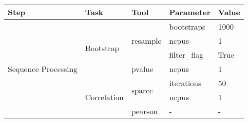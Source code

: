 \begin{table}[H]
\centering
\small
\begin{tabular}{lllll}
\hline
\textbf{Step}                             & \textbf{Task}                                            & \textbf{Tool}                          & \textbf{Parameter}                     & \textbf{Value}                                                                                           \\ \hline
\multirow{17}{*}{Sequence Processing}     & \multirow{4}{*}{Bootstrap}                               & \multirow{3}{*}{resample}              & bootstraps                             & 1000                                                                                                     \\
                                          &                                                          &                                        & ncpus                                  & 1                                                                                                        \\
                                          &                                                          &                                        & filter\_flag                           & True                                                                                                     \\
                                          &                                                          & pvalue                                 & ncpus                                  & 1                                                                                                        \\ \cline{2-5}
                                          & \multirow{12}{*}{Correlation}                            & \multirow{2}{*}{sparcc}                & iterations                             & 50                                                                                                       \\
                                          &                                                          &                                        & ncpus                                  & 1                                                                                                        \\
                                          &                                                          & pearson                                & -                                      & -                                                                                                        \\

\end{tabular}
\end{table}
